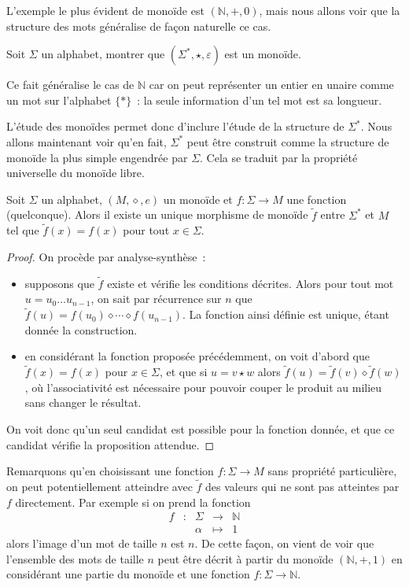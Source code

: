 L'exemple le plus évident de monoïde est $(\mathbb N,+,0)$, mais nous allons
voir que la structure des mots généralise de façon naturelle ce cas.

\begin{exercise}
  Soit $\Sigma$ un alphabet, montrer que $(\Sigma^*, \star,\varepsilon)$ est un
  monoïde.
\end{exercise}

Ce fait généralise le cas de $\mathbb N$ car on peut représenter un entier en
unaire comme un mot sur l'alphabet $\{*\}$~: la seule information d'un tel mot
est sa longueur.

L'étude des monoïdes permet donc d'inclure l'étude de la structure de
$\Sigma^*$. Nous allons maintenant voir qu'en fait, $\Sigma^*$ peut être
construit comme la structure de monoïde la plus simple engendrée par $\Sigma$.
Cela se traduit par la propriété universelle du monoïde libre.

\begin{theorem}
  Soit $\Sigma$ un alphabet, $(M,\diamond,e)$ un monoïde et $f : \Sigma \to M$
  une fonction (quelconque). Alors il existe un unique morphisme de monoïde
  $\tilde f$ entre $\Sigma^*$ et $M$ tel que $\tilde f (x) = f(x)$ pour tout
  $x \in \Sigma$.
\end{theorem}

\begin{proof}
  On procède par analyse-synthèse~:
  \begin{itemize}
  \item supposons que $\tilde f$ existe et vérifie les conditions décrites.
    Alors pour tout mot $u = u_0\ldots u_{n-1}$, on sait par récurrence sur
    $n$ que $\tilde f(u) = f(u_0)\diamond \cdots \diamond f(u_{n-1})$. La
    fonction ainsi définie est unique, étant donnée la construction.
  \item en considérant la fonction proposée précédemment, on voit d'abord que
    $\tilde f(x) = f(x)$ pour $x\in \Sigma$, et que si $u = v\star w$ alors
    $\tilde f(u) = \tilde f(v)\diamond \tilde f(w)$, où l'associativité est
    nécessaire pour pouvoir couper le produit au milieu sans changer le
    résultat.
  \end{itemize}
  On voit donc qu'un seul candidat est possible pour la fonction donnée, et que
  ce candidat vérifie la proposition attendue.
\end{proof}

Remarquons qu'en choisissant une fonction $f : \Sigma \to M$ sans propriété
particulière, on peut potentiellement atteindre avec $\tilde f$ des valeurs qui
ne sont pas atteintes par $f$ directement. Par exemple si on prend la fonction
\[\begin{array}{ccccc}
f & : & \Sigma & \longrightarrow & \mathbb N\\
& & \alpha & \longmapsto & 1
\end{array}\]
alors l'image d'un mot de taille $n$ est $n$. De cette façon, on vient de voir
que l'ensemble des mots de taille $n$ peut être décrit à partir du monoïde
$(\mathbb N,+,1)$ en considérant une partie du monoïde et une fonction
$f : \Sigma \to \mathbb N$.

